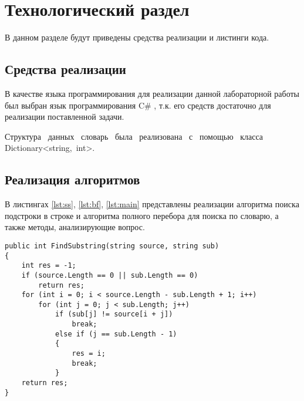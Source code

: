 \chapter{Технологический раздел}

В данном разделе будут приведены средства реализации и листинги кода.

\section{Средства реализации}

В качестве языка программирования для реализации данной лабораторной работы был выбран язык программирования C\# \cite{sharplang}, т.к. его средств достаточно для реализации поставленной задачи.

Структура~ данных ~словарь~ была~ реализована~ с ~помощью ~класса \\Dictionary<string,~int>.

\section{Реализация алгоритмов}
В листингах \ref{lst:ss}, \ref{lst:bf}, \ref{lst:main} представлены реализации алгоритма поиска подстроки в строке и алгоритма полного перебора для поиска по словарю, а также методы, анализирующие вопрос.
\captionsetup{justification=raggedright, singlelinecheck=false}

\begin{lstlisting}[label=lst:ss,caption=Реализация алгоритма поиска подстроки в строке]
public int FindSubstring(string source, string sub)
{
	int res = -1;
	if (source.Length == 0 || sub.Length == 0)
		return res;
	for (int i = 0; i < source.Length - sub.Length + 1; i++)
		for (int j = 0; j < sub.Length; j++)
			if (sub[j] != source[i + j])
				break;
			else if (j == sub.Length - 1)
			{
				res = i;
				break;
			}
	return res;
}
\end{lstlisting}

